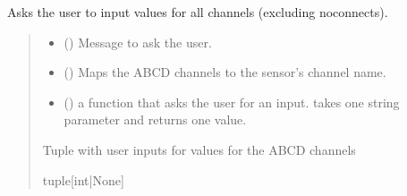 \documentclass[letterpaper,10pt,english]{sphinxmanual}
\begin{document}
\begin{fulllineitems}
\begin{fulllineitems}
\label{\detokenize{Setup.SetupOneDevice:Setup.SetupOneDevice.Setup_8401HR.Setup8401HR._SetForMappedChannels}}
\pysigstartsignatures
{}
\pysigstopsignatures
\sphinxAtStartPar
Asks the user to input values for all channels (excluding no\sphinxhyphen{}connects).
\begin{quote}\begin{description}
\begin{itemize}
\item {} 
\sphinxAtStartPar
{} () \textendash{} Message to ask the user.

\item {} 
\sphinxAtStartPar
{} (\sphinxstyleliteralemphasis{\sphinxupquote{{[}}}\sphinxstyleliteralemphasis{\sphinxupquote{,}}\sphinxstyleliteralemphasis{\sphinxupquote{{]}}}) \textendash{} Maps the ABCD channels to the sensor’s channel name.

\item {} 
\sphinxAtStartPar
{} () \textendash{} a function that asks the user for an input. takes one string                 parameter and returns one value.

\end{itemize}

\sphinxAtStartPar
Tuple with user inputs for values for the ABCD channels

\sphinxAtStartPar
tuple{[}int|None{]}

\end{description}\end{quote}


\end{fulllineitems}
\end{fulllineitems}
\end{document}
